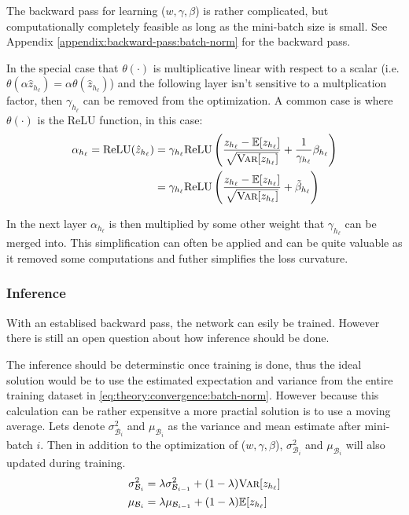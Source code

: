 The backward pass for learning ($w, \gamma, \beta$) is rather complicated, but computationally completely feasible as long as the mini-batch size is small. See Appendix \ref{appendix:backward-pass:batch-norm} for the backward pass.

In the special case that $\theta(\cdot)$ is multiplicative linear with respect to a scalar (i.e. $\theta(\alpha \hat{z}_{h_\ell}) = \alpha \theta(\hat{z}_{h_\ell})$) and the following layer isn't sensitive to a multplication factor, then $\gamma_{h_\ell}$ can be removed from the optimization. A common case is where $\theta(\cdot)$ is the ReLU function, in this case:
\begin{equation}
\begin{aligned}
\alpha_{h_\ell} = \mathrm{ReLU}(\hat{z}_{h_\ell}) &= \gamma_{h_\ell} \mathrm{ReLU}\left(\frac{z_{h_\ell} - \mathbb{E}[z_{h_\ell}]}{\sqrt{\textsc{Var}[z_{h_\ell}]}} +  \frac{1}{\gamma_{h_\ell}}\beta_{h_\ell}\right)\\
&= \gamma_{h_\ell} \mathrm{ReLU}\left(\frac{z_{h_\ell} - \mathbb{E}[z_{h_\ell}]}{\sqrt{\textsc{Var}[z_{h_\ell}]}} +  \tilde{\beta}_{h_\ell}\right)
\end{aligned}
\end{equation}

In the next layer $\alpha_{h_\ell}$ is then multiplied by some other weight that $\gamma_{h_\ell}$ can be merged into. This simplification can often be applied and can be quite valuable as it removed some computations and futher simplifies the loss curvature.

\subsubsection{Inference}

With an establised backward pass, the network can esily be trained. However there is still an open question about how inference should be done.

The inference should be determinstic once training is done, thus the ideal solution would be to use the estimated expectation and variance from the entire training dataset in \eqref{eq:theory:convergence:batch-norm}. However because this calculation can be rather expensitve a more practial solution is to use a moving average. Lets denote $\sigma^2_{\mathcal{B}_i}$ and $\mu_{\mathcal{B}_i}$ as the variance and mean estimate after mini-batch $i$. Then in addition to the optimization of ($w, \gamma, \beta$), $\sigma^2_{\mathcal{B}_i}$ and $\mu_{\mathcal{B}_i}$ will also updated during training.
\begin{equation}
\begin{aligned}
\sigma^2_{\mathcal{B}_i} &= \lambda \sigma^2_{\mathcal{B}_{i-1}} + (1 - \lambda) \textsc{Var}[z_{h_\ell}] \\
\mu_{\mathcal{B}_i} &= \lambda \mu_{\mathcal{B}_{i-1}} + (1 - \lambda) \mathbb{E}[z_{h_\ell}]
\end{aligned}
\end{equation}

